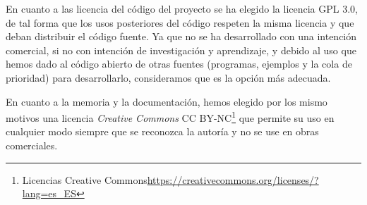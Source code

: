 En cuanto a las licencia del código del proyecto se ha elegido la licencia GPL 3.0, de tal forma que los usos posteriores del código respeten la misma licencia y que deban distribuir el código fuente. Ya que no se ha desarrollado con una intención comercial, si no con intención de investigación y aprendizaje, y debido al uso que hemos dado al código abierto de otras fuentes (programas, ejemplos y la cola de prioridad) para desarrollarlo, consideramos que es la opción más adecuada.

En cuanto a la memoria y la documentación, hemos elegido por los mismo motivos una licencia \textit{Creative Commons} CC BY-NC\footnote{Licencias Creative Commons\url{https://creativecommons.org/licenses/?lang=es_ES}} que permite su uso en cualquier modo siempre que se reconozca la autoría y no se use en obras comerciales.